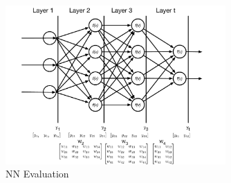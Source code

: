 \documentclass{article}
\begin{document}
\begin{figure}[h]
\includegraphics[width=0.75\textwidth]{lectFF/nnEval.pdf}
\caption{NN Evaluation}
\end{figure}
\end{document}
